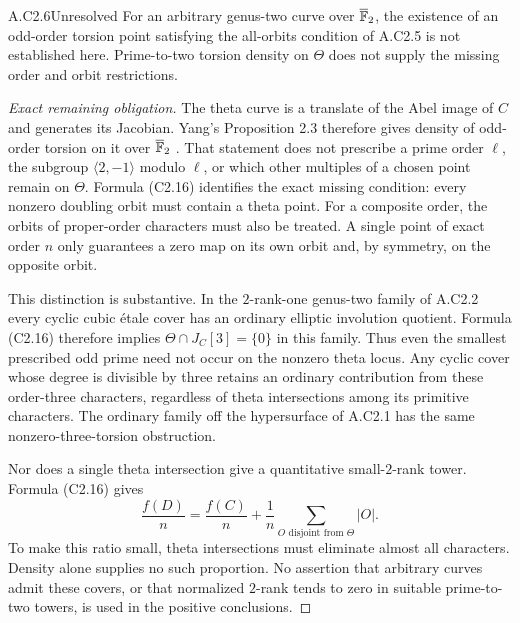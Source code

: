 \begin{claim}{A.C2.6}{Unresolved}
For an arbitrary genus-two curve over $\overline{\mathbb F}_2$, the
existence of an odd-order torsion point satisfying the
all-orbits condition of A.C2.5 is not established here.
Prime-to-two torsion density on $\Theta$ does not supply the
missing order and orbit restrictions.
\end{claim}
\begin{proof}[Exact remaining obligation]
The theta curve is a translate of the Abel image of $C$ and
generates its Jacobian. Yang's Proposition 2.3 therefore gives
density of odd-order torsion on it over $\overline{\mathbb F}_2$
\citep{A_Yang2016}. That statement does not prescribe a prime
order $\ell$, the subgroup $\langle2,-1\rangle$ modulo $\ell$,
or which other multiples of a chosen point remain on $\Theta$.
Formula (C2.16) identifies the exact missing condition: every
nonzero doubling orbit must contain a theta point. For a
composite order, the orbits of proper-order characters must
also be treated. A single point of exact order $n$ only
guarantees a zero map on its own orbit and, by symmetry,
on the opposite orbit.

This distinction is substantive. In the $2$-rank-one genus-two
family of A.C2.2 every cyclic cubic \'etale cover has an ordinary
elliptic involution quotient. Formula (C2.16) therefore implies
$\Theta\cap J_C[3]=\{0\}$ in this family. Thus even the
smallest prescribed odd prime need not occur on the nonzero
theta locus. Any cyclic cover whose degree is divisible by
three retains an ordinary contribution from these order-three
characters, regardless of theta intersections among its
primitive characters. The ordinary family off the hypersurface
of A.C2.1 has the same nonzero-three-torsion obstruction.

Nor does a single theta intersection give a quantitative
small-$2$-rank tower. Formula (C2.16) gives
\[
 \frac{f(D)}n=\frac{f(C)}n+
   \frac1n\sum_{O\text{ disjoint from }\Theta}|O|.
\]
To make this ratio small, theta intersections must eliminate
almost all characters. Density alone supplies no such
proportion. No assertion that arbitrary curves admit these
covers, or that normalized $2$-rank tends to zero in suitable
prime-to-two towers, is used in the positive conclusions.
\end{proof}
